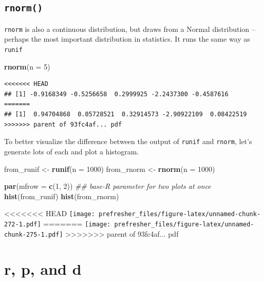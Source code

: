 \documentclass[]{book}
\newenvironment{Shaded}{\begin{snugshade}}{\end{snugshade}}
\newcommand{\CommentTok}[1]{\textcolor[rgb]{0.56,0.35,0.01}{\textit{#1}}}
\newcommand{\DataTypeTok}[1]{\textcolor[rgb]{0.13,0.29,0.53}{#1}}
\newcommand{\DecValTok}[1]{\textcolor[rgb]{0.00,0.00,0.81}{#1}}
\newcommand{\KeywordTok}[1]{\textcolor[rgb]{0.13,0.29,0.53}{\textbf{#1}}}
\newcommand{\NormalTok}[1]{#1}
\newcommand{\StringTok}[1]{\textcolor[rgb]{0.31,0.60,0.02}{#1}}
\theoremstyle{definition}
\theoremstyle{definition}
\theoremstyle{definition}
\theoremstyle{remark}
\begin{document}
\begin{Shaded}
\begin{Highlighting}[]
\begin{Shaded}
\begin{Highlighting}[]
\begin{Shaded}
\begin{Highlighting}[]
\hypertarget{rnorm}{%
\subsection*{\texorpdfstring{\texttt{rnorm()}}{rnorm()}}\label{rnorm}}

\texttt{rnorm} is also a continuous distribution, but draws from a Normal distribution -- perhaps the most important distribution in statistics. It runs the same way as \texttt{runif}

\begin{Shaded}
\begin{Highlighting}[]
\KeywordTok{rnorm}\NormalTok{(}\DataTypeTok{n =} \DecValTok{5}\NormalTok{)}
\end{Highlighting}
\end{Shaded}

\begin{verbatim}
<<<<<<< HEAD
## [1] -0.9168349 -0.5256658  0.2999925 -2.2437300 -0.4587616
=======
## [1]  0.94704868  0.05728521  0.32914573 -2.90922109  0.08422519
>>>>>>> parent of 93fc4af... pdf
\end{verbatim}

To better visualize the difference between the output of \texttt{runif} and \texttt{rnorm}, let's generate lots of each and plot a histogram.

\begin{Shaded}
\begin{Highlighting}[]
\NormalTok{from_runif <-}\StringTok{ }\KeywordTok{runif}\NormalTok{(}\DataTypeTok{n =} \DecValTok{1000}\NormalTok{)}
\NormalTok{from_rnorm <-}\StringTok{ }\KeywordTok{rnorm}\NormalTok{(}\DataTypeTok{n =} \DecValTok{1000}\NormalTok{)}

\KeywordTok{par}\NormalTok{(}\DataTypeTok{mfrow =} \KeywordTok{c}\NormalTok{(}\DecValTok{1}\NormalTok{, }\DecValTok{2}\NormalTok{)) }\CommentTok{## base-R parameter for two plots at once}
\KeywordTok{hist}\NormalTok{(from_runif)}
\KeywordTok{hist}\NormalTok{(from_rnorm)}
\end{Highlighting}
\end{Shaded}

<<<<<<< HEAD
\texttt{[image: prefresher\_files/figure-latex/unnamed-chunk-272-1.pdf]}
=======
\texttt{[image: prefresher\_files/figure-latex/unnamed-chunk-275-1.pdf]}
>>>>>>> parent of 93fc4af... pdf

\hypertarget{r-p-and-d}{%
\section{r, p, and d}\label{r-p-and-d}}


\end{Highlighting}
\end{Shaded}
\end{Highlighting}
\end{Shaded}
\end{Highlighting}
\end{Shaded}
\end{document}
